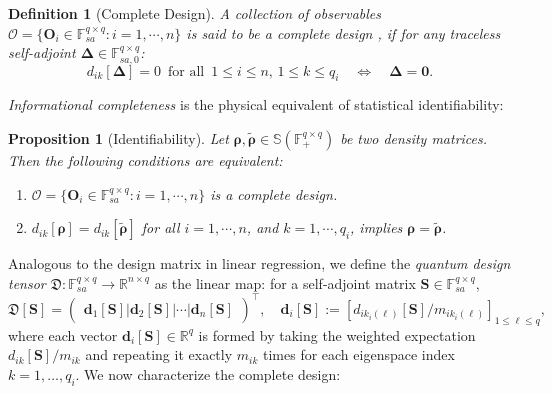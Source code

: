 \documentclass[noinfoline]{imsart}\setcounter{tocdepth}{2}
\renewcommand{\b}[1]{\mathbb{#1}} %
\newcommand{\m}[1]{\mathbf{#1}} %
\newcommand{\s}[1]{\mathscr{#1}} %
\newcommand{\f}[1]{\mathfrak{#1}} %
\newcommand{\mb}[1]{\boldsymbol{#1}} %
\theoremstyle{plain}
\newtheorem{proposition}[theorem]{Proposition}
\newtheorem{definition}[theorem]{Definition}
\begin{document}
\begin{definition}[Complete Design] \label{def:complete_design}
A collection of observables $\s{O} = \{\m{O}_{i} \in \b{F}_{sa}^{q \times q}: i = 1, \cdots, n\}$ is said to be a \emph{complete design} \cite{busch1991informationally}, if for any traceless self-adjoint $\mb{\Delta} \in \b{F}_{sa, 0}^{q \times q}$:
\begin{equation*}
    d_{ik}[\mb{\Delta}] = 0 \, \text{ for all } \, 1 \le i \le n, \, 1 \le k \le q_{i} \quad \iff \quad \mb{\Delta} = \m{0}.
\end{equation*}
\end{definition}

\emph{Informational completeness} is the physical equivalent of statistical identifiability:
\begin{proposition}[Identifiability]\label{prop:identifi}
Let $\mb{\rho}, \tilde{\mb{\rho}} \in \b{S}(\b{F}_{+}^{q \times q})$ be two density matrices. Then the following conditions are equivalent:
\begin{enumerate}
\item $\s{O} = \{\m{O}_{i} \in \b{F}_{sa}^{q \times q}: i = 1, \cdots, n\}$ is a complete design.
\item $d_{ik}[\mb{\rho}] = d_{ik}[\tilde{\mb{\rho}}]$ for all $i = 1, \cdots, n$, and $k = 1, \cdots, q_{i}$, implies $\mb{\rho} = \tilde{\mb{\rho}}$.
\end{enumerate}
\end{proposition}



Analogous to the design matrix in linear regression, we define the \emph{quantum design tensor} $\f{D}: \b{F}_{sa}^{q \times q} \to \b{R}^{n \times q}$ as the linear map: for a self-adjoint matrix $\m{S} \in \b{F}_{sa}^{q \times q}$,
\begin{equation}\label{eq:quant:des:op}
    \f{D}[\m{S}] = 
    \begin{pmatrix}
        \m{d}_{1}[\m{S}] \vert \m{d}_{2}[\m{S}] \vert   \cdots \vert \m{d}_{n}[\m{S}]
    \end{pmatrix}^{\top}, \quad \m{d}_{i}[\m{S}] := \left[d_{i k_{i}(\ell)}[\m{S}]/m_{i k_{i}(\ell)}  \right]_{1 \le \ell \le q}, 
\end{equation}
where each vector $\m{d}_{i}[\m{S}] \in \b{R}^{q}$ is formed by taking the weighted expectation $d_{ik}[\m{S}]/m_{ik}$ and repeating it exactly $m_{ik}$ times for each eigenspace index $k = 1, \dots, q_{i}$. We now characterize the complete design:
\end{document}
